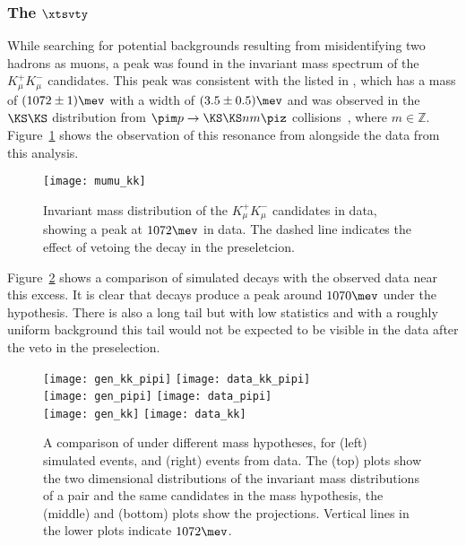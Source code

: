 \subsubsection[The \xtsvty]{The $\boldsymbol{\xtsvty}$}
\label{sec:x1070}
While searching for potential backgrounds resulting from misidentifying two hadrons as muons, a
peak was found in the invariant mass spectrum of the $K_\mu^+K_\mu^-$ candidates.
This peak was consistent with the \xtsvty listed in , which has a mass of
$(1072\pm1)\mev$ with a width of $(3.5\pm0.5)\mev$ and was observed in the $\KS\KS$ distribution
from $\pim p \to \KS \KS n m\piz$ collisions~\cite{x1070vlad}, where $m\in\mathbb{Z}$.
Figure~\ref{fig:x1070} shows the observation of this resonance from  alongside
the data from this analysis.

\begin{figure}
  \begin{center}
    \texttt{[image: mumu\_kk]}
    \caption[Invariant mass of the \mumu distribution under the \kk mass hypotheses]
    {
      Invariant mass distribution of the $K_\mu^+K_\mu^-$ candidates in data, showing a peak at
      \approx$1072\mev$ in data.
      The dashed line indicates the effect of vetoing the decay
      \decay{\KS}{\pip\pim} in the preseletcion.
    }
    \label{fig:x1070}
  \end{center}
\end{figure}

Figure~\ref{fig:db:x1070:2d} shows a comparison of simulated \decay{\KS}{\pipi} decays with the
observed data near this excess.
It is clear that \decay{\KS}{\pipi} decays produce a peak around $1070\mev$ under the \kk
hypothesis.
There is also a long tail but with low statistics and with a roughly uniform
background this tail would not be expected to be visible in the data after the \KS veto in the
preselection.

\begin{figure}
  \begin{center}
    \texttt{[image: gen\_kk\_pipi]}
    \texttt{[image: data\_kk\_pipi]}\\
    \texttt{[image: gen\_pipi]}
    \texttt{[image: data\_pipi]}\\
    \texttt{[image: gen\_kk]}
    \texttt{[image: data\_kk]}
    \caption[Analysis of the \decay{\KS}{\pipi} background under the \kk mass hypothesis]
    {
      A comparison of \decay{\KS}{\pi\pi} under different mass hypotheses, for
      (left) simulated events, and
      (right) events from data.
      The (top) plots show the two dimensional distributions of the invariant mass distributions of
      a \pipi pair and the same candidates in the \kk mass hypothesis, the (middle) and (bottom)
      plots show the projections.
      Vertical lines in the lower plots indicate $1072\mev$.
    }
    \label{fig:db:x1070:2d}
  \end{center}
\end{figure}



